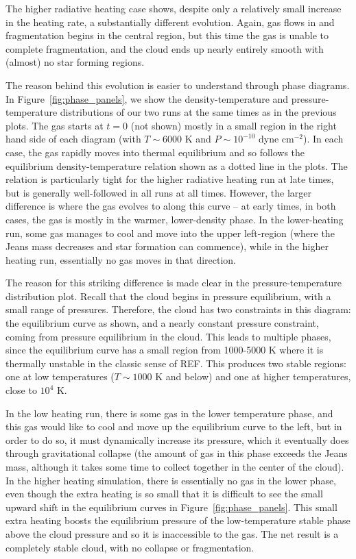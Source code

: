 \documentclass[useAMS,usenatbib]{mn2e}
\begin{document}
The higher radiative heating case shows, despite only a relatively small increase in the heating rate, a substantially different evolution. Again,
gas flows in and fragmentation begins in the central region, but this time the gas is unable to complete fragmentation, and the cloud ends up nearly
entirely smooth with (almost) no star forming regions.

The reason behind this evolution is easier to understand through phase diagrams.  In Figure~\ref{fig:phase_panels}, we show the density-temperature
and pressure-temperature distributions of our two runs at the same times as in the previous plots.  The gas starts at $t=0$ (not shown) mostly in a
small region in the right hand side of each diagram (with $T \sim 6000$ K and $P \sim 10^{-10}$ dyne cm$^{-2}$).  In each case, the gas rapidly moves
into thermal equilibrium and so follows the equilibrium density-temperature relation shown as a dotted line in the plots. The relation is particularly
tight for the higher radiative heating run at late times, but is generally well-followed in all runs at all times. However, the larger difference is
where the gas evolves to along this curve -- at early times, in both cases, the gas is mostly in the warmer, lower-density phase. In the lower-heating
run, some gas manages to cool and move into the upper left-region (where the Jeans mass decreases and star formation can commence), while in the higher
heating run, essentially no gas moves in that direction.  

The reason for this striking difference is made clear in the pressure-temperature distribution plot.  Recall that the cloud begins in pressure equilibrium, with a small range of pressures.  Therefore, the cloud has two constraints in this diagram: the equilibrium curve as shown, and a nearly constant pressure constraint, coming from pressure equilibrium in the cloud.  This leads to multiple phases, since the equilibrium curve has a small region from 1000-5000 K where it is thermally unstable in the classic sense of REF.  This produces two stable regions: one at low temperatures ($T \sim 1000$ K and below) and one at higher temperatures, close to $10^4$ K.   

In the low heating run, there is some gas in the lower temperature phase, and this gas would like to cool and move up the equilibrium curve to the left, but in order to do so, it must dynamically increase its pressure, which it eventually does through gravitational collapse (the amount of gas in this phase exceeds the Jeans mass, although it takes some time to collect together in the center of the cloud).  In the higher heating simulation, there is essentially no gas in the lower phase, even though the extra heating is so small that it is difficult to see the small upward shift in the equilibrium curves in Figure~\ref{fig:phase_panels}.  This small extra heating boosts the equilibrium pressure of the low-temperature stable phase above the cloud pressure and so it is inaccessible to the gas.  The net result is a completely stable cloud, with no collapse or fragmentation.
\end{document}
